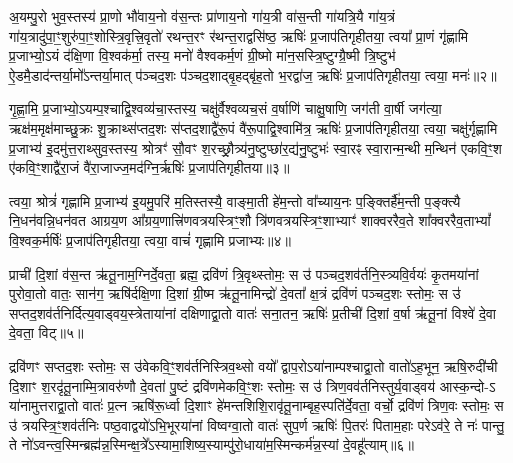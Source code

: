 {\anuvakamend[{योनौ॒ पञ्च॑दश च॥१॥}]}

अ॒यम्पु॒रो भुव॒स्तस्य॑ प्रा॒णो भौ॑वाय॒नो व॑स॒न्तः प्रा॑णाय॒नो गा॑य॒त्री वा॑स॒न्ती गा॑यत्रि॒यै गा॑य॒त्रं गा॑य॒त्रादु॑पा॒ꣳ॒शु\-रु॑पा॒ꣳ॒शोस्त्रि॒वृत्त्रि॒वृतो॑ रथन्त॒रꣳ र॑थन्त॒राद्वसि॑ष्ठ॒ ऋषिः॑ प्र॒जाप॑तिगृहीतया॒ त्वया᳚ प्रा॒णं गृ॑ह्णामि प्र॒जाभ्यो॒\-ऽयं द॑क्षि॒णा वि॒श्वक॑र्मा॒ तस्य॒ मनो॑ वैश्वकर्म॒णं ग्री॒ष्मो मा॑न॒सस्त्रि॒ष्टुग्ग्रै॒ष्मी त्रि॒ष्टुभ॑ ऐ॒डमै॒डाद॑न्तर्या॒मो᳚\-ऽन्तर्या॒मात् प॑ञ्चद॒शः प॑ञ्चद॒शाद्बृ॒हद्बृ॑ह॒तो भ॒रद्वा॑ज॒ ऋषिः॑ प्र॒जाप॑तिगृहीतया॒ त्वया॒ मनः॑॥२॥

गृ॒ह्णा॒मि॒ प्र॒जाभ्यो॒\-ऽयम्प॒श्चाद्वि॒श्वव्य॑चा॒स्तस्य॒ चक्षु॑र्वैश्वव्यच॒सं व॒र्\mbox{}षाणि॑ चाक्षु॒षाणि॒ जग॑ती वा॒र्\mbox{}षी जग॑त्या॒ ऋक्ष॑म॒मृक्ष॑माच्छु॒क्रः शु॒क्राथ्स॑प्तद॒शः स॑प्तद॒शाद्वै॑रू॒पं वै॑रू॒पाद्वि॒श्वामि॑त्र॒ ऋषिः॑ प्र॒जाप॑तिगृहीतया॒ त्वया॒ चक्षु॑र्गृह्णामि प्र॒जाभ्य॑ इ॒दमु॑त्त॒राथ्सुव॒स्तस्य॒ श्रोत्रꣳ॑ सौ॒वꣳ श॒रच्छ्रौ॒त्र्य॑नु॒ष्टुप्छा॑र॒द्य॑नु॒ष्टुभः॑ स्वा॒रꣴ स्वा॒रान्म॒न्थी म॒न्थिन॑ एकवि॒ꣳ॒श ए॑कवि॒ꣳ॒शाद्वै॑रा॒जं वै॑रा॒जाज्ज॒मद॑ग्नि॒र्\mbox{}ऋषिः॑ प्र॒जाप॑तिगृहीतया॥३॥

त्वया॒ श्रोत्रं॑ गृह्णामि प्र॒जाभ्य॑ इ॒यमु॒परि॑ म॒तिस्तस्यै॒ वाङ्मा॒ती हे॑म॒न्तो वा᳚च्याय॒नः प॒ङ्क्तिर्\mbox{}है॑म॒न्ती प॒ङ्क्त्यै नि॒धन॑वन्नि॒धन॑वत आग्रय॒ण आ᳚ग्रय॒णात्त्रि॑णवत्रयस्त्रिꣳ॒शौ त्रि॑णवत्रयस्त्रिꣳ॒शाभ्याꣳ॑ शाक्वररैव॒ते शा᳚क्वररैव॒ता\-भ्यां᳚ वि॒श्वक॒र्मर्\mbox{}षिः॑ प्र॒जाप॑तिगृहीतया॒ त्वया॒ वाचं॑ गृह्णामि प्रजाभ्यः॥४॥

{\anuvakamend[{त्वया॒ मनो॑ ज॒मद॑ग्नि॒र्\mbox{}ऋषिः॑ प्र॒जाप॑तिगृहीतया त्रि॒ꣳ॒शच्च॑॥२॥}]}

प्राची॑ दि॒शां व॑स॒न्त ऋ॑तू॒नाम॒ग्निर्दे॒वता॒ ब्रह्म॒ द्रवि॑णं त्रि॒वृथ्स्तोमः॒ स उ॑ पञ्चद॒शव॑र्तनि॒स्त्र्यवि॒र्वयः॑ कृ॒तमया॑नां पुरोवा॒तो वातः॒ सान॑ग॒ ऋषि॑र्दक्षि॒णा दि॒शां ग्री॒ष्म ऋ॑तू॒नामिन्द्रो॑ दे॒वता᳚ क्ष॒त्रं द्रवि॑णं पञ्चद॒शः स्तोमः॒ स उ॑ सप्तद॒शव॑र्तनिर्दित्य॒वाड्वय॒स्त्रेताया॑नां दक्षिणाद्वा॒तो वातः॑ सना॒तन॒ ऋषिः॑ प्र॒तीची॑ दि॒शां व॒र्\mbox{}षा ऋ॑तू॒नां विश्वे॑ दे॒वा दे॒वता॒ विट्॥५॥

द्रवि॑णꣳ सप्तद॒शः स्तोमः॒ स उ॑वेकवि॒ꣳ॒शव॑र्तनिस्त्रिव॒थ्सो वयो᳚ द्वाप॒रो\-ऽया॑नाम्पश्चाद्वा॒तो वातो॑\-ऽह॒भून॒ ऋषि॒रुदी॑ची दि॒शाꣳ श॒रदृ॑तू॒नाम्मि॒त्रावरु॑णौ दे॒वता॑ पु॒ष्टं द्रवि॑णमेकवि॒ꣳ॒शः स्तोमः॒ स उ॑ त्रिण॒वव॑र्तनिस्तुर्य॒वाड्वय॑ आस्क॒न्दो-\-ऽ या॑नामुत्तराद्वा॒तो वातः॑ प्र॒त्न ऋषि॑रू॒र्ध्वा दि॒शाꣳ हे॑मन्तशिशि॒रावृ॑तू॒नाम्बृह॒स्पति॑र्दे॒वता॒ वर्चो॒ द्रवि॑णं त्रिण॒वः स्तोमः॒ स उ॑ त्रयस्त्रि॒ꣳ॒शव॑र्तनिः पष्ठ॒वाद्वयो॑\-ऽभि॒भूरया॑नां विष्वग्वा॒तो वातः॑ सुप॒र्ण ऋषिः॑ पि॒तरः॑ पिताम॒हाः परे\-ऽव॑रे॒ ते नः॑ पान्तु॒ ते नो॑\-ऽवन्त्व॒स्मिन्ब्रह्म॑न्न॒स्मिन्क्ष॒त्रे᳚\-ऽस्यामा॒शिष्य॒स्याम्पु॑रो॒धाया॑म॒स्मिन्कर्म॑न्न॒स्यां दे॒वहू᳚त्याम्॥६॥


